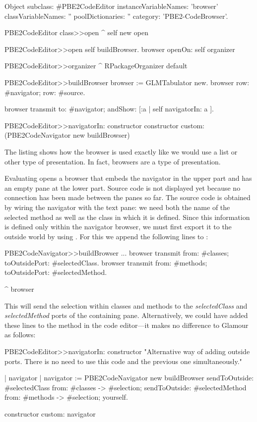 \documentclass[a4paper,10pt,twoside]{book}
\begin{document}
\begin{code}{}
Object subclass: #PBE2CodeEditor
	instanceVariableNames: 'browser'
	classVariableNames: ''
	poolDictionaries: ''
	category: 'PBE2-CodeBrowser'.

PBE2CodeEditor class>>open
  ^ self new open

PBE2CodeEditor>>open
  self buildBrowser.
  browser openOn:  self  organizer

PBE2CodeEditor>>organizer 
  ^ RPackageOrganizer default

PBE2CodeEditor>>buildBrowser 
  browser := GLMTabulator new.
  browser 
    row: #navigator;
    row: #source.
    
  browser transmit to: #navigator; andShow:  [:a | self navigatorIn: a ]. 

PBE2CodeEditor>>navigatorIn:  constructor
  constructor custom: (PBE2CodeNavigator new buildBrowser)
\end{code}


The listing shows how the browser is used exactly like we would use a
list or other type of presentation. In fact, browsers are a type of
presentation.

Evaluating  opens a browser that embeds the navigator in the upper part and has an empty
pane at the lower part. Source code is not displayed yet because no connection has been made between the panes so far. The source code is obtained by wiring the navigator with the text pane: we need both the name of the selected method as well as the
class in which it is defined. Since this information is defined only
within the navigator browser, we must first export it to the outside
world by using . For this we
append the following lines to :

\begin{code}{}
PBE2CodeNavigator>>buildBrowser
  ...
  browser transmit from: #classes; toOutsidePort:  #selectedClass. 
  browser transmit from: #methods; toOutsidePort:  #selectedMethod.
  
  ^ browser
\end{code}

This will send the selection within classes and methods to the
\emph{selectedClass} and \emph{selectedMethod} ports of the containing
pane. Alternatively, we could have added these lines to the
 method in the code editor---it makes no difference
to Glamour as follows:

\begin{code}{}
PBE2CodeEditor>>navigatorIn: constructor
  "Alternative way of adding outside ports. There is no need to use this
   code and the previous one simultaneously."

  | navigator |
  navigator := PBE2CodeNavigator new buildBrowser
          sendToOutside: #selectedClass from: #classes -> #selection;
          sendToOutside: #selectedMethod from: #methods -> #selection;
          yourself.
  
  constructor custom: navigator
\end{code}
\end{document}
